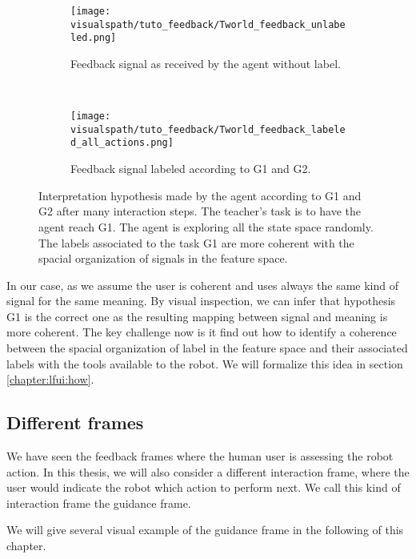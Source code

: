 \begin{figure}[!ht]
    \centering
    \begin{subfigure}[t]{\tworldsize\columnwidth}
        \centering
        \texttt{[image: \\visualspath/tuto\_feedback/Tworld\_feedback\_unlabeled.png]}
        \caption{Feedback signal as received by the agent without label.}
    \end{subfigure}\\
    \begin{subfigure}[b]{\columnwidth}
        \centering
        \texttt{[image: \\visualspath/tuto\_feedback/Tworld\_feedback\_labeled\_all\_actions.png]}
        \caption{Feedback signal labeled according to G1 and G2.}
        \label{fig:TworldLabelinterpretation}
    \end{subfigure}
    \caption{Interpretation hypothesis made by the agent according to G1 and G2 after many interaction steps. The teacher's task is to have the agent reach G1. The agent is exploring all the state space randomly. The labels associated to the task G1 are more coherent with the spacial organization of signals in the feature space.}
    \label{fig:TworldLabel}
\end{figure}

In our case, as we assume the user is coherent and uses always the same kind of signal for the same meaning. By visual inspection, we can infer that hypothesis G1 is the correct one as the resulting mapping between signal and meaning is more coherent. The key challenge now is it find out how to identify a coherence between the spacial organization of label in the feature space and their associated labels with the tools available to the robot. We will formalize this idea in section \ref{chapter:lfui:how}. 

\subsection{Different frames}

We have seen the feedback frames where the human user is assessing the robot action. In this thesis, we will also consider a different interaction frame, where the user would indicate the robot which action to perform next. We call this kind of interaction frame the guidance frame.

We will give several visual example of the guidance frame in the following of this chapter.


